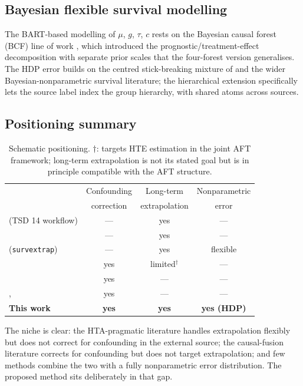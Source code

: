 \documentclass[11pt]{article}
\newcommand{\tauf}{\tau}
\newcommand{\cf}{c}
\newcommand{\gf}{g}
\newcommand{\muf}{\mu}
\begin{document}
\subsection{Bayesian flexible survival modelling}

The BART-based modelling of $\muf$, $\gf$, $\tauf$, $\cf$ rests on the
Bayesian causal forest (BCF) line of work \citep{Hahn2020}, which introduced
the prognostic/treatment-effect decomposition with separate prior scales
that the four-forest version generalises. The HDP error builds on the
centred stick-breaking mixture of \citet{Yang2010} and the wider
Bayesian-nonparametric survival literature; the hierarchical extension
specifically lets the source label index the group hierarchy, with shared
atoms across sources.

\subsection{Positioning summary}

\begin{table}[h]
\centering\small
\begin{tabular}{lccc}
\toprule
& Confounding & Long-term      & Nonparametric \\
& correction  & extrapolation  & error         \\
\midrule
\citet{Latimer2013} (TSD 14 workflow)        & --- & yes & ---  \\
\citet{Guyot2017}                            & --- & yes & ---  \\
\citet{Jackson2023} (\texttt{survextrap})    & --- & yes & flexible \\
\citet{Ye2025}                               & yes & limited$^\dagger$ & --- \\
\citet{YangLiuZengWang2025}                  & yes & ---       & --- \\
\citet{Kallus2018}, \citet{Yao2024}          & yes & ---       & --- \\
\textbf{This work}                           & \textbf{yes} & \textbf{yes} & \textbf{yes (HDP)} \\
\bottomrule
\end{tabular}
\caption{Schematic positioning. $\dagger$: \citet{Ye2025} targets HTE
estimation in the joint AFT framework; long-term extrapolation is not its
stated goal but is in principle compatible with the AFT structure.}
\end{table}

The niche is clear: the HTA-pragmatic literature handles extrapolation
flexibly but does not correct for confounding in the external source; the
causal-fusion literature corrects for confounding but does not target
extrapolation; and few methods combine the two with a fully nonparametric
error distribution. The proposed method sits deliberately in that gap.
\end{document}
